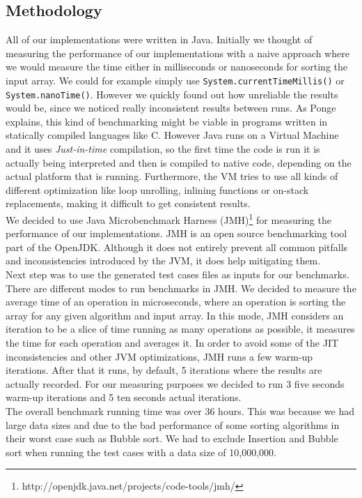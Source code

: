 
\subsection{Methodology}

All of our implementations were written in Java. Initially we thought of measuring the performance of our implementations with a naive approach where we would measure the time either in milliseconds or nanoseconds for sorting the input array. We could for example simply use \texttt{System.currentTimeMillis()} or \texttt{System.nanoTime()}. However we quickly found out how unreliable the results would be, since we noticed really inconsistent results between runs. As Ponge\cite{architectBenchmarking} explains, this kind of benchmarking might be viable in programs written in statically compiled languages like C. However Java runs on a Virtual Machine and it uses \emph{Just-in-time} compilation, so the first time the code is run it is actually being interpreted and then is compiled to native code, depending on the actual platform that is running. Furthermore, the VM tries to use all kinds of different optimization like loop unrolling, inlining functions or on-stack replacements, making it difficult to get consistent results. \\
We decided to use Java Microbenchmark Harness (JMH)\footnote{http://openjdk.java.net/projects/code-tools/jmh/} for measuring the performance of our implementations. JMH is an open source benchmarking tool part of the OpenJDK. Although it does not entirely prevent all common pitfalls and inconsistencies introduced by the JVM, it does help mitigating them. \\
Next step was to use the generated test cases files as inputs for our benchmarks. There are different modes to run benchmarks in JMH. We decided to measure the average time of an operation in microseconds, where an operation is sorting the array for any given algorithm and input array. In this mode, JMH considers an iteration to be a slice of time running as many operations as possible, it measures the time for each operation and averages it. In order to avoid some of the JIT inconsistencies and other JVM  optimizations, JMH runs a few warm-up iterations. After that it runs, by default, 5 iterations where the results are actually recorded. For our measuring purposes we decided to run 3  five seconds warm-up iterations and 5 ten seconds actual iterations.\\

The overall benchmark running time was over 36 hours. This was because we had large data sizes and due to the bad performance of some sorting algorithms in their worst case such as Bubble sort. We had to exclude Insertion and Bubble sort when running the test cases with a data size of 10,000,000.

